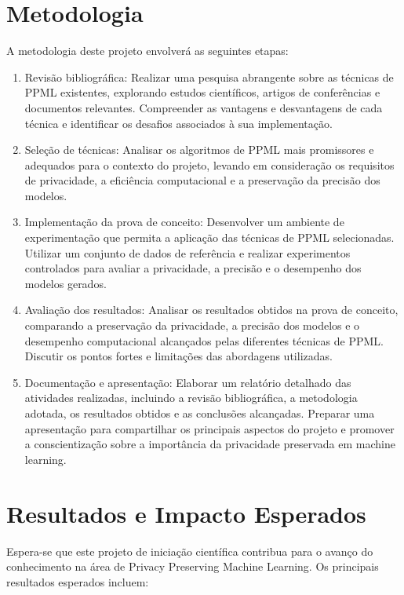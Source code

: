 \documentclass{article}
\begin{document}
\section{Metodologia}
A metodologia deste projeto envolverá as seguintes etapas:

\begin{enumerate}
\item Revisão bibliográfica: Realizar uma pesquisa abrangente sobre as técnicas de PPML existentes, explorando estudos científicos, artigos de conferências e documentos relevantes. Compreender as vantagens e desvantagens de cada técnica e identificar os desafios associados à sua implementação.
\item Seleção de técnicas: Analisar os algoritmos de PPML mais promissores e adequados para o contexto do projeto, levando em consideração os requisitos de privacidade, a eficiência computacional e a preservação da precisão dos modelos.
\item Implementação da prova de conceito: Desenvolver um ambiente de experimentação que permita a aplicação das técnicas de PPML selecionadas. Utilizar um conjunto de dados de referência e realizar experimentos controlados para avaliar a privacidade, a precisão e o desempenho dos modelos gerados.
\item Avaliação dos resultados: Analisar os resultados obtidos na prova de conceito, comparando a preservação da privacidade, a precisão dos modelos e o desempenho computacional alcançados pelas diferentes técnicas de PPML. Discutir os pontos fortes e limitações das abordagens utilizadas.
\item Documentação e apresentação: Elaborar um relatório detalhado das atividades realizadas, incluindo a revisão bibliográfica, a metodologia adotada, os resultados obtidos e as conclusões alcançadas. Preparar uma apresentação para compartilhar os principais aspectos do projeto e promover a conscientização sobre a importância da privacidade preservada em machine learning.
\end{enumerate}

\section{Resultados e Impacto Esperados}
Espera-se que este projeto de iniciação científica contribua para o avanço do conhecimento na área de Privacy Preserving Machine Learning. Os principais resultados esperados incluem:
\end{document}
